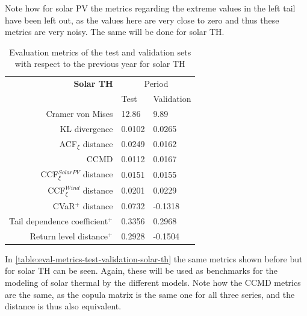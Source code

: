 Note how for solar PV the metrics regarding the extreme values in the left tail have been left out, as the values here are very close to zero and thus these metrics are very noisy. The same will be done for solar TH. 

\begin{table}[ht]
    \centering
    \begin{tabular}{rll}
        \toprule
        \textbf{Solar TH} & \multicolumn{2}{c}{Period} \\ 
        \cmidrule(lr){2-3}
            & Test & Validation \\
        \midrule
        Cramer von Mises & 12.86 & 9.89 \\
        KL divergence & 0.0102 & 0.0265 \\
        ACF$_\xi$ distance & 0.0249 & 0.0162 \\
        \midrule
        CCMD & 0.0112 & 0.0167 \\
        CCF$_\xi^{Solar PV}$ distance & 0.0151 & 0.0155 \\
        CCF$_\xi^{Wind}$ distance & 0.0201 & 0.0229 \\
        \midrule
        CVaR$^+$ distance & 0.0732 & -0.1318 \\
        Tail dependence coefficient$^+$ & 0.3356 & 0.2968 \\
        Return level distance$^+$ & 0.2928 & -0.1504 \\
        \bottomrule
    \end{tabular}
    \caption{Evaluation metrics of the test and validation sets with respect to the previous year for solar TH}
    \label{table:eval-metrics-test-validation-solar-th}
\end{table}

In \autoref{table:eval-metrics-test-validation-solar-th} the same metrics shown before but for solar TH can be seen. Again, these will be used as benchmarks for the modeling of solar thermal by the different models. Note how the CCMD metrics are the same, as the copula matrix is the same one for all three series, and the distance is thus also equivalent.

